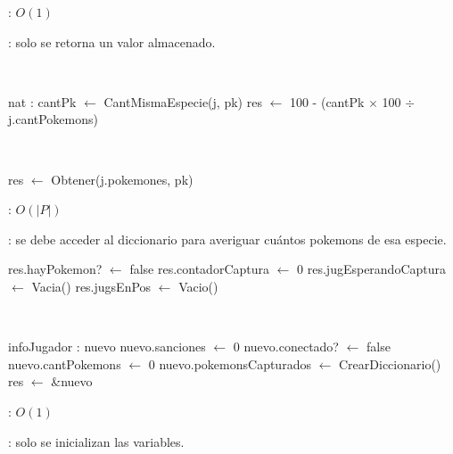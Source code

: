 \begin{Algoritmos}
	\complejidad: $O(1)$

	\justifcomp: solo se retorna un valor almacenado.

	~

	\begin{algorithm}[H]
		\NoCaptionOfAlgo
		\caption{}
		nat : cantPk $\leftarrow$ CantMismaEspecie(j, pk)
		res $\leftarrow$ 100 - (cantPk $\times$ 100 $\div$ j.cantPokemons)
	\end{algorithm}

	~

	\begin{algorithm}[H]
		\NoCaptionOfAlgo
		\caption{}
		res $\leftarrow$ Obtener(j.pokemones, pk)
	\end{algorithm}

	\complejidad: $O(|P|)$

	\justifcomp: se debe acceder al diccionario para averiguar cuántos pokemons de esa especie.



	\begin{algorithm}[H]
		\NoCaptionOfAlgo
		\caption{}
		\BlankLine
		res.hayPokemon? $\leftarrow$ false
		res.contadorCaptura $\leftarrow$ 0
		res.jugEsperandoCaptura $\leftarrow$ Vacia()
		res.jugsEnPos $\leftarrow$ Vacio()
	\end{algorithm}
	
	~

	\begin{algorithm}[H]
		\NoCaptionOfAlgo
		\caption{}
		\BlankLine
		infoJugador : nuevo
		nuevo.sanciones $\leftarrow$ 0
		nuevo.conectado? $\leftarrow$ false
		nuevo.cantPokemons $\leftarrow$ 0
		nuevo.pokemonsCapturados $\leftarrow$ CrearDiccionario()
		res $\leftarrow$ \&nuevo
	\end{algorithm}

	\complejidad: $O(1)$

	\justifcomp: solo se inicializan las variables.


\end{Algoritmos}
